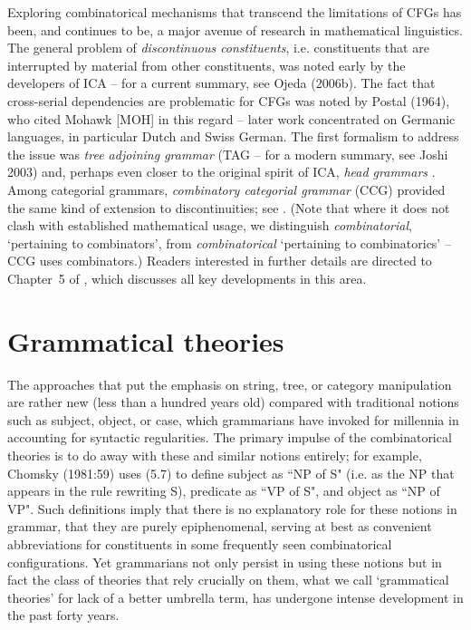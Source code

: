 Exploring combinatorical mechanisms that transcend the limitations of CFGs has
been, and continues to be, a major avenue of research in mathematical
linguistics. The general problem of {\it discontinuous constituents}, i.e.
%
constituents that are interrupted by material from other
constituents, was noted early by the developers of ICA -- for a current
summary, see Ojeda (2006b).\nocite{Ojeda:2006} The fact that cross-serial
dependencies are problematic for CFGs was noted by Postal (1964), who cited
Mohawk [MOH] in this regard -- later work concentrated on Germanic languages,
in particular Dutch and Swiss German.  The first formalism to address the
issue was {\it tree adjoining grammar} (TAG -- for a modern summary, see
\nocite{Joshi:2003} Joshi 2003) and, perhaps even closer to the original
spirit of ICA, {\it head grammars} \cite{Pollard:1984}. Among categorial
grammars, {\it combinatory categorial grammar} (CCG) provided the same kind of
extension to discontinuities; see . (Note that where it
does not clash with established mathematical usage, we distinguish {\it
  combinatorial}, `pertaining to combinators', from {\it combinatorical}
`pertaining to combinatorics' -- CCG uses combinators.) Readers interested in
further details are directed to Chapter~5 of , which
discusses all key developments in this area.  

\section{Grammatical theories}

The approaches that put the emphasis on string, tree, or category manipulation
are rather new (less than a hundred years old) compared with traditional
notions such as subject, object, or case, which grammarians have invoked for
millennia in accounting for syntactic regularities. The primary impulse of the
combinatorical theories is to do away with these and similar notions entirely;
for example, Chomsky (1981:59) uses (5.7) to define subject as ``NP of S"
(i.e.  as the NP that appears in the rule rewriting S), predicate as ``VP of
S", and object as ``NP of VP". Such definitions imply that there is no
explanatory role for these notions in grammar, that they are purely
epiphenomenal, serving at best as convenient abbreviations for constituents in
some frequently seen combinatorical configurations. Yet grammarians not only
persist in using these notions but in fact the class of theories that rely
crucially on them, what we call `grammatical theories' for lack of a better
umbrella term, has undergone intense development in the past forty years.

